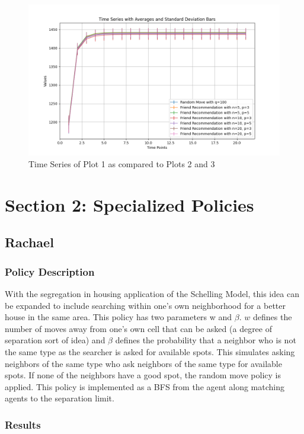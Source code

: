 \documentclass[12pt]{article}
\begin{document}
	\begin{figure}
		\centering
		\includegraphics[width=\textwidth]{policies01.png}
		\caption{Time Series of Plot 1 as compared to Plots 2 and 3}
	\end{figure}
	\FloatBarrier

	\newpage
	\section{Section 2: Specialized Policies}
	\subsection{Rachael}
	\subsubsection{Policy Description}
	With the segregation in housing application of the Schelling Model, this idea can be expanded to include searching within one's own neighborhood for a better house in the same area. This policy has two parameters w and $\beta$. $w$ defines the number of moves away from one's own cell that can be asked (a degree of separation sort of idea) and $\beta$ defines the probability that a neighbor who is not the same type as the searcher is asked for available spots. This simulates asking neighbors of the same type who ask neighbors of the same type for available spots. If none of the neighbors have a good spot, the random move policy is applied. This policy is implemented as a BFS from the agent along matching agents to the separation limit.
	
	\subsubsection{Results}
\end{document}
